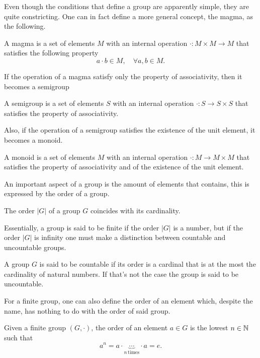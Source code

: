 Even though the conditions that define a group are apparently simple, they are quite constricting. One can in fact define a more general concept, the magma, as the following.
\begin{defn}[magma]
    A magma is a set of elements $M$ with an internal operation $\cdot : M \times M \to M$ that satisfies the following property
    \begin{equation}
        a \cdot b \in M,\quad \forall a,b\in M.
    \end{equation}
\end{defn}
If the operation of a magma satisfy only the property of associativity, then it becomes a semigroup
\begin{defn}[semigroup]
    A semigroup is a set of elements $S$ with an internal operation $\cdot : S \to S \times S$ that satisfies the property of associativity. 
\end{defn}
Also, if the operation of a semigroup satisfies the existence of the unit element, it becomes a monoid.
\begin{defn}[monoid]
    A monoid is a set of elements $M$ with an internal operation $\cdot : M \to M \times M$ that satisfies the property of associativity and of the existence of the unit element.
\end{defn}
An important aspect of a group is the amount of elements that contains, this is expressed by the order of a group.
\begin{defn}
    The order $|G|$ of a group $G$ coincides with its cardinality.
\end{defn}
Essentially, a group is said to be finite if the order $|G|$ is a number, but if the order $|G|$ is infinity one must make a distinction between countable and uncountable groups.  
\begin{defn}
    A group $G$ is said to be countable if its order is a cardinal that is at the most the cardinality of natural numbers. If that's not the case the group is said to be uncountable.
\end{defn}
For a finite group, one can also define the order of an element which, despite the name, has nothing to do with the order of said group.
\begin{defn}
    Given a finite group $(G,\cdot)$, the order of an element $a \in G$ is the lowest $n \in \mathbb{N}$ such that 
    \begin{equation}
        a^n = a\cdot\underbrace{\cdots}_{n\,\mathrm{times}}\cdot a = e.
    \end{equation}
\end{defn}
